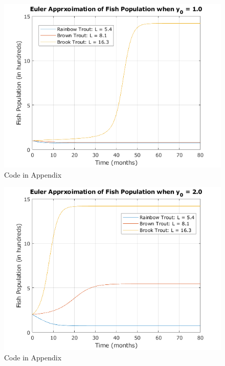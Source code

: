 \documentclass[letterpaper,12pt]{article}
\begin{document}
\begin{figure}[H]
    \centering
    \includegraphics{./figures/fig.4.1.2.png}
    \caption{Code in Appendix}
    \label{fig:8}
\end{figure}
\begin{figure}[H]
    \centering
    \includegraphics{./figures/fig.4.1.3.png}
    \caption{Code in Appendix}
    \label{fig:9}
\end{figure}
\end{document}
